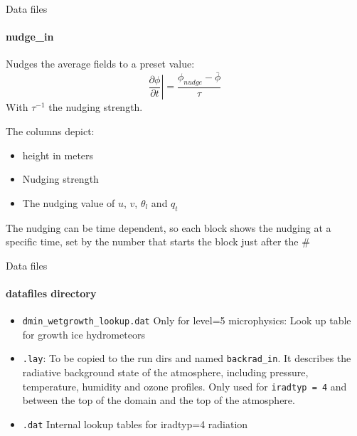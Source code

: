 \documentclass[handout]{beamer}
\newcommand{\derr}[2]{\frac{\partial #1}{\partial #2}}
\newcommand{\code}[1]{{\tt #1}}
\begin{document}
\begin{frame}{Data files}
\framesubtitle{nudge\_in}
Nudges the average fields to a preset value:
\[
 \left.\derr{\phi}{t}\right| = \frac{\phi_{nudge} - \bar{\phi}}{\tau}
\]
 With $\tau^{-1}$ the nudging strength.


The columns depict:
\begin{itemize}
 \item height in meters
 \item Nudging strength
 \item The nudging value of $u$, $v$, $\theta_l$ and $q_t$
\end{itemize}

The nudging can be time dependent, so each block shows the nudging at a specific time, set by the number that starts the block just after the \#
\end{frame}

\begin{frame}{Data files}
\framesubtitle{datafiles directory}
\begin{itemize}
 \item \code{dmin\_wetgrowth\_lookup.dat} Only for level=5 microphysics: Look up table for growth ice hydrometeors
 \item \code{*.lay}: To be copied to the run dirs and named \code{backrad\_in}. It describes the radiative background state of the atmosphere, including pressure, temperature, humidity and ozone profiles. Only used for \code{iradtyp = 4} and between the top of the domain and the top of the atmosphere. 
 \item \code{*.dat} Internal lookup tables for iradtyp=4 radiation
\end{itemize}
\end{frame}
\end{document}
